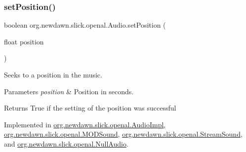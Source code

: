 \mbox{\label{interfaceorg_1_1newdawn_1_1slick_1_1openal_1_1_audio_ace6e2e6fd29f40a8fe5daf8b28bc75e7}} 
\subsubsection{\texorpdfstring{set\+Position()}{setPosition()}}
{\footnotesize\ttfamily boolean org.\+newdawn.\+slick.\+openal.\+Audio.\+set\+Position (\begin{DoxyParamCaption}\item[{float}]{position }\end{DoxyParamCaption})}

Seeks to a position in the music.


\begin{DoxyParams}{Parameters}
{\em position} & Position in seconds. \\
\hline
\end{DoxyParams}
\begin{DoxyReturn}{Returns}
True if the setting of the position was successful 
\end{DoxyReturn}


Implemented in \mbox{\hyperlink{classorg_1_1newdawn_1_1slick_1_1openal_1_1_audio_impl_a9291d2e2d534fdfbd6a50e4948de954f}{org.\+newdawn.\+slick.\+openal.\+Audio\+Impl}}, \mbox{\hyperlink{classorg_1_1newdawn_1_1slick_1_1openal_1_1_m_o_d_sound_a28988cbdc108aa8daab78bbad8750f97}{org.\+newdawn.\+slick.\+openal.\+M\+O\+D\+Sound}}, \mbox{\hyperlink{classorg_1_1newdawn_1_1slick_1_1openal_1_1_stream_sound_aa530fe0393188182c1a956f6c381a937}{org.\+newdawn.\+slick.\+openal.\+Stream\+Sound}}, and \mbox{\hyperlink{classorg_1_1newdawn_1_1slick_1_1openal_1_1_null_audio_a833763970d1f01efe17bbc58bbb3ca59}{org.\+newdawn.\+slick.\+openal.\+Null\+Audio}}.

\mbox{\label{interfaceorg_1_1newdawn_1_1slick_1_1openal_1_1_audio_a8346ca83b84cb6605efb695462f12337}} 
